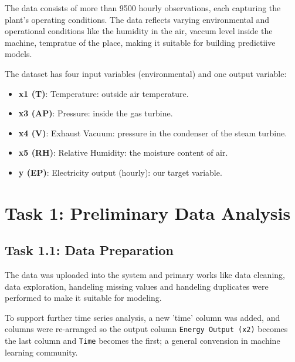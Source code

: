 \documentclass[12pt,a4paper]{article}
\begin{document}
The data %
consists 
of more than 9500 hourly observations, each capturing the plant's operating conditions. 
The data reflects varying environmental and operational conditions like the humidity in the air, vaccum 
level inside the machine, tempratue of the place, 
making it suitable for building predictiive models. 

The dataset has four input variables (environmental) and one output variable:

\begin{itemize}
  \item \textbf{x1 (T)}: Temperature: outside air temperature.
  \item \textbf{x3 (AP)}: Pressure: inside the gas turbine.
  \item \textbf{x4 (V)}: Exhaust Vacuum: pressure in the condenser of the steam turbine.
  \item \textbf{x5 (RH)}: Relative Humidity: the moisture content of air.
  \item \textbf{y (EP)}: Electricity output (hourly): our target variable.
\end{itemize}


\section*{Task 1: Preliminary Data Analysis}

\subsection*{Task 1.1: Data Preparation}

The data was uploaded into the system and primary works like data cleaning, data exploration, handeling
missing values and handeling duplicates were performed to make it suitable for modeling.  

To support further time series analysis, a new 'time' 
column was added, and columns were re-arranged so the output column \texttt{Energy Output (x2)} becomes 
the last column and \texttt{Time} becomes the first; a general convension in machine learning 
community.
\end{document}
